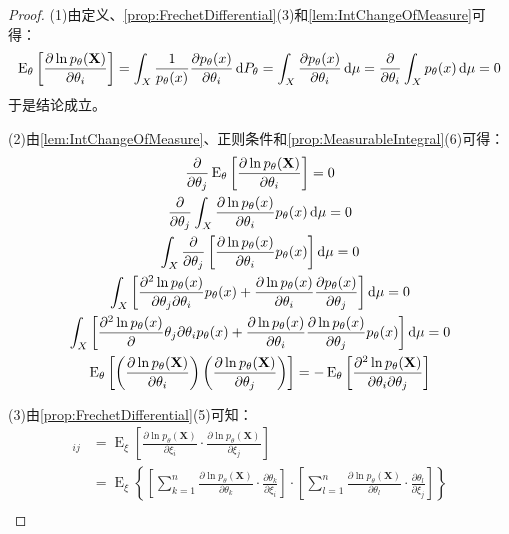 \begin{proof}
	(1)由定义、\cref{prop:FrechetDifferential}(3)和\cref{lem:IntChangeOfMeasure}可得：
	\begin{equation*}
		\operatorname{E}_{\theta}\left[\frac{\partial\ln p_{\theta}( \mathbf{X})}{\partial\theta_i}\right]=\int_{X}\frac{1}{p_{\theta}(x)}\frac{\partial p_{\theta}(x)}{\partial\theta_i}\mathop{}\!\mathrm{d} P_{\theta}=\int_{X}\frac{\partial p_{\theta}(x)}{\partial\theta_i}\mathop{}\!\mathrm{d}\mu=\frac{\partial}{\partial\theta_i}\int_{X}p_{\theta}(x)\mathop{}\!\mathrm{d}\mu=0 \\
	\end{equation*}
	于是结论成立。\par
	(2)由\cref{lem:IntChangeOfMeasure}、正则条件和\cref{prop:MeasurableIntegral}(6)可得：
	\begin{gather*}
		\frac{\partial}{\partial\theta_j}\operatorname{E}_{\theta}\left[\frac{\partial\ln p_{\theta}( \mathbf{X})}{\partial\theta_i}\right]=0 \\
		\frac{\partial}{\partial\theta_j}\int_{X}\frac{\partial\ln p_{\theta}(x)}{\partial\theta_i}p_{\theta}(x)\mathop{}\!\mathrm{d}\mu=0 \\
		\int_{X}\frac{\partial}{\partial\theta_j}\left[\frac{\partial\ln p_{\theta}(x)}{\partial\theta_i}p_{\theta}(x)\right]\mathop{}\!\mathrm{d}\mu=0 \\
		\int_{X}\left[\frac{\partial^2\ln p_{\theta}(x)}{\partial\theta_j\partial\theta_i}p_{\theta}(x)+\frac{\partial\ln p_{\theta}(x)}{\partial\theta_i}\frac{\partial p_{\theta}(x)}{\partial\theta_j}\right]\mathop{}\!\mathrm{d}\mu=0 \\
		\int_{X}\left[\frac{\partial^2\ln p_{\theta}(x)}\partial\theta_j{\partial\theta_i}p_{\theta}(x)+\frac{\partial\ln p_{\theta}(x)}{\partial\theta_i}\frac{\partial \ln p_{\theta}(x)}{\partial\theta_j}p_{\theta}(x)\right]\mathop{}\!\mathrm{d}\mu=0 \\
		\operatorname{E}_{\theta}\left[\left(\frac{\partial\ln p_{\theta}( \mathbf{X})}{\partial\theta_i}\right)\left(\frac{\partial\ln p_{\theta}( \mathbf{X})}{\partial\theta_j}\right)\right]=-\operatorname{E}_{\theta}\left[\frac{\partial^2\ln p_{\theta}( \mathbf{X})}{\partial\theta_i\partial\theta_j}\right]
	\end{gather*}\par
	(3)由\cref{prop:FrechetDifferential}(5)可知：
	\begin{align*}
		[I(\xi)]_{ij}&=\operatorname{E}_{\xi}\left[\frac{\partial\ln p_{\theta}( \mathbf{X})}{\partial\xi_i}\cdot\frac{\partial\ln p_{\theta}( \mathbf{X})}{\partial\xi_j}\right] \\
		&=\operatorname{E}_{\xi}\left\{\left[\sum_{k=1}^n\frac{\partial\ln p_{\theta}( \mathbf{X})}{\partial\theta_k}\cdot\frac{\partial\theta_k}{\partial\xi_i}\right]\cdot\left[\sum_{l=1}^n\frac{\partial\ln p_{\theta}( \mathbf{X})}{\partial\theta_l}\cdot\frac{\partial\theta_l}{\partial\xi_j}\right]\right\} \\

\end{align*}
\end{proof}
